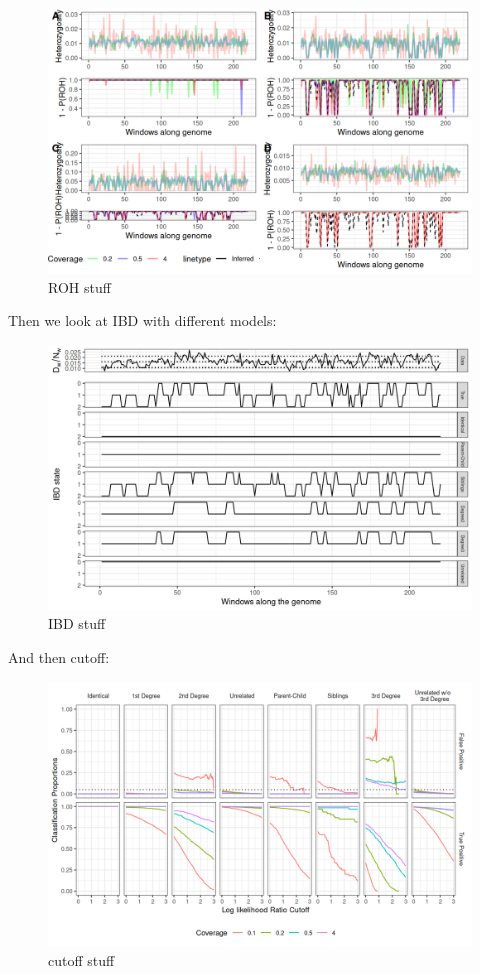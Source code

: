 \documentclass[12pt, letterpaper]{article}
\begin{document}
\graphicspath{{plots/plotimg/}}
\begin{figure}[htp]
    \centering
    \includegraphics[width=18cm]{ROHplot.png}
    \caption{ROH stuff}
    \label{fig:galaxy}
\end{figure}

Then we look at IBD with different models:
\begin{figure}[htp]
    \centering
    \includegraphics[width=18cm]{IBDplot.png}
    \caption{IBD stuff}
    \label{fig:galaxy}
\end{figure}

And then cutoff:
\begin{figure}[htp]
    \centering
    \includegraphics[width=18cm]{contam0_inbred0_model_performance_allroc_asc0_plot.png}
    \caption{cutoff stuff}
    \label{fig:galaxy}
\end{figure}
\end{document}
